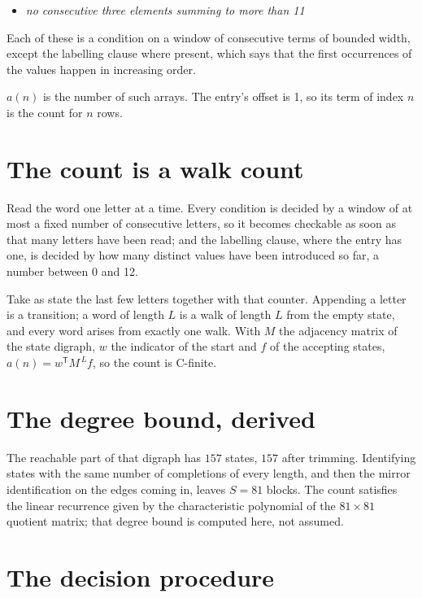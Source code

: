 \documentclass[11pt]{article}
\theoremstyle{definition}
\begin{document}
\begin{itemize}

\item {\itshape no consecutive three elements summing to more than 11}

\end{itemize}

Each of these is a condition on a window of consecutive terms of bounded width, except the labelling clause where present, which says that the first occurrences of the values happen in increasing order.

$a(n)$ is the number of such arrays. The entry's offset is 1, so its term of index $n$ is the count for $n$ rows.

\section{The count is a walk count}

Read the word one letter at a time. Every condition is decided by a window of at most a fixed number of consecutive letters, so it becomes checkable as soon as that many letters have been read; and the labelling clause, where the entry has one, is decided by how many distinct values have been introduced so far, a number between $0$ and 12.

Take as state the last few letters together with that counter. Appending a letter is a transition; a word of length $L$ is a walk of length $L$ from the empty state, and every word arises from exactly one walk. With $M$ the adjacency matrix of the state digraph, $w$ the indicator of the start and $f$ of the accepting states, $a(n) = w^{\mathsf T}M^{\,L}f$, so the count is C-finite.

\section{The degree bound, derived}

The reachable part of that digraph has $157$ states, $157$ after trimming. Identifying states with the same number of completions of every length, and then the mirror identification on the edges coming in, leaves $S = 81$ blocks. The count satisfies the linear recurrence given by the characteristic polynomial of the $81\times81$ quotient matrix; that degree bound is computed here, not assumed.

\section{The decision procedure}
\end{document}
